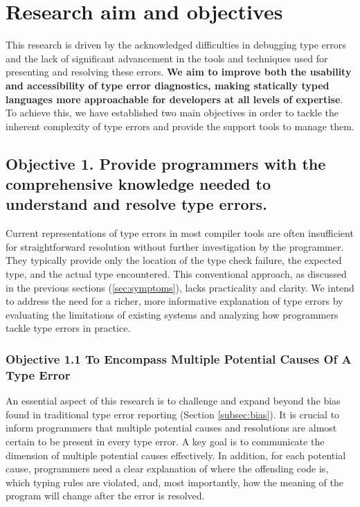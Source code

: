 \section{Research aim and objectives}

This research is driven by the acknowledged difficulties in debugging type errors and the lack of significant advancement in the tools and techniques used for presenting and resolving these errors. \textbf{We aim to improve both the usability and accessibility of type error diagnostics, making statically typed languages more approachable for developers at all levels of expertise}. To achieve this, we have established two main objectives in order to tackle the inherent complexity of type errors and provide the support tools to manage them.

\subsection{Objective 1. Provide programmers with the comprehensive knowledge needed to understand and resolve type errors.}
\label{subsec:aim1}

Current representations of type errors in most compiler tools are often insufficient for straightforward resolution without further investigation by the programmer. They typically provide only the location of the type check failure, the expected type, and the actual type encountered. This conventional approach, as discussed in the previous sections (\ref{sec:symptoms}), lacks practicality and clarity. We intend to address the need for a richer, more informative explanation of type errors by evaluating the limitations of existing systems and analyzing how programmers tackle type errors in practice.

\subsubsection{Objective 1.1 To Encompass Multiple Potential Causes Of A Type Error}
An essential aspect of this research is to challenge and expand beyond the bias found in traditional type error reporting (Section \ref{subsec:bias}). It is crucial to inform programmers that multiple potential causes and resolutions are almost certain to be present in every type error. A key goal is to communicate the dimension of multiple potential causes effectively. In addition, for each potential cause, programmers need a clear explanation of where the offending code is, which typing rules are violated, and, most importantly, how the meaning of the program will change after the error is resolved.


